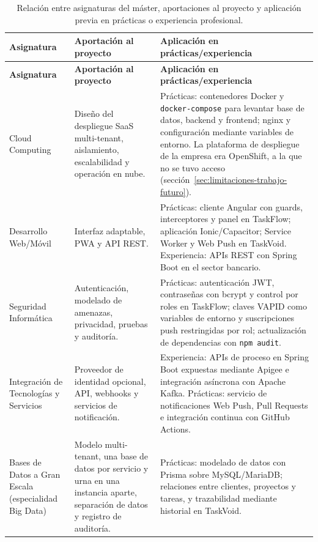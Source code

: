 \small
\begin{longtable}{|>{\RaggedRight\arraybackslash}p{}|>{\RaggedRight\arraybackslash}p{}|>{\RaggedRight\arraybackslash}p{}|}
\caption[Relación entre asignaturas del máster, proyecto y aplicación previa.]{Relación entre asignaturas del máster, aportaciones al proyecto y aplicación previa en prácticas o experiencia profesional.}\label{tab:encaje-master}\\
\hline
\textbf{Asignatura} & \textbf{Aportación al proyecto} & \textbf{Aplicación en prácticas/experiencia} \\
\hline
\endfirsthead
\hline
\textbf{Asignatura} & \textbf{Aportación al proyecto} & \textbf{Aplicación en prácticas/experiencia} \\
\hline
\endhead
\hline
\endfoot
\hline
\endlastfoot
Cloud Computing & Diseño del despliegue SaaS multi-tenant, aislamiento, escalabilidad y operación en nube. & Prácticas: contenedores Docker y \texttt{docker-compose} para levantar base de datos, backend y frontend; nginx y configuración mediante variables de entorno. La plataforma de despliegue de la empresa era OpenShift, a la que no se tuvo acceso (sección~\ref{sec:limitaciones-trabajo-futuro}). \\
\hline
Desarrollo \mbox{Web/Móvil} & Interfaz adaptable, PWA y API REST. & Prácticas: cliente Angular con guards, interceptores y panel en TaskFlow; aplicación Ionic/Capacitor; Service Worker y Web Push en TaskVoid. Experiencia: APIs REST con Spring Boot en el sector bancario. \\
\hline
Seguridad Informática & Autenticación, modelado de amenazas, privacidad, pruebas y auditoría. & Prácticas: autenticación JWT, contraseñas con bcrypt y control por roles en TaskFlow; claves VAPID como variables de entorno y suscripciones push restringidas por rol; actualización de dependencias con \texttt{npm audit}. \\
\hline
Integración de Tecnologías y Servicios & Proveedor de identidad opcional, API, webhooks y servicios de notificación. & Experiencia: APIs de proceso en Spring Boot expuestas mediante Apigee e integración asíncrona con Apache Kafka. Prácticas: servicio de notificaciones Web Push, Pull Requests e integración continua con GitHub Actions. \\
\hline
Bases de Datos a Gran Escala (especialidad Big Data) & Modelo multi-tenant, una base de datos por servicio y urna en una instancia aparte, separación de datos y registro de auditoría. & Prácticas: modelado de datos con Prisma sobre MySQL/MariaDB; relaciones entre clientes, proyectos y tareas, y trazabilidad mediante historial en TaskVoid. \\

\end{longtable}
